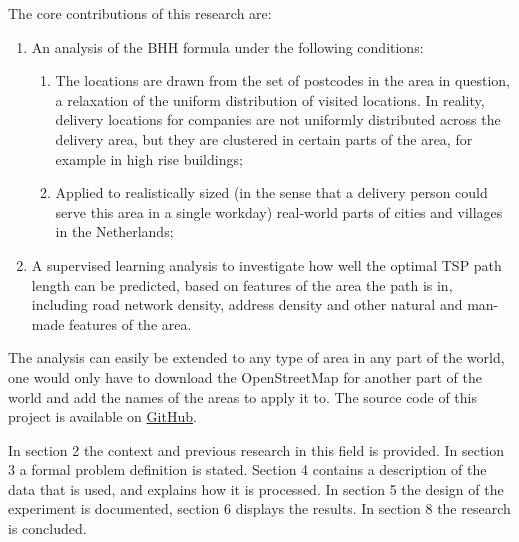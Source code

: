 The core contributions of this research are:
\begin{enumerate}
	\item An analysis of the BHH formula under the following conditions:
	      \begin{enumerate}
		      \item The locations are drawn from the set of postcodes in the area in question, a relaxation of the uniform distribution of visited
		            locations. In reality, delivery locations for companies are not uniformly distributed across the delivery area, but they are clustered
		            in certain parts of the area, for example in high rise buildings;
		      \item Applied to realistically sized (in the sense that a delivery person could serve this area in a single workday) real-world parts of
		            cities and villages in the Netherlands;
	      \end{enumerate}
	\item A supervised learning analysis to investigate how well the optimal TSP path length can be
	      predicted, based on features of the area the path is in, including road network density,
	      address density and other natural and man-made features of the area.
\end{enumerate}
The analysis can easily be extended to any type of area in any part of the world, one would only
have to download the OpenStreetMap \citep{openstreetmap} for another part of the world and add the names of the areas
to apply it to. The source code of this project is available on
\href{https://github.com/koen1859/BSc_Thesis}{GitHub}.

In section 2 the context and previous research in this field is provided.
In section 3 a formal problem definition is stated. 
Section 4 contains a description of the data that is used, and explains how it is processed.
In section 5 the design of the experiment is documented, section 6 displays the results.
In section 8 the research is concluded.
